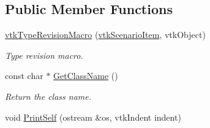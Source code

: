 \subsection*{Public Member Functions}
\begin{DoxyCompactItemize}
\item 
\hypertarget{classvtkScenarioItem_ac1b3cca069a98dc214fe9b3e0058bc6c}{
\hyperlink{classvtkScenarioItem_ac1b3cca069a98dc214fe9b3e0058bc6c}{vtkTypeRevisionMacro} (\hyperlink{classvtkScenarioItem}{vtkScenarioItem}, vtkObject)}
\label{classvtkScenarioItem_ac1b3cca069a98dc214fe9b3e0058bc6c}

\begin{DoxyCompactList}\small\item\em Type revision macro. \item\end{DoxyCompactList}\item 
\hypertarget{classvtkScenarioItem_ae81ad46352f0a673792f2964de67efc1}{
const char $\ast$ \hyperlink{classvtkScenarioItem_ae81ad46352f0a673792f2964de67efc1}{GetClassName} ()}
\label{classvtkScenarioItem_ae81ad46352f0a673792f2964de67efc1}

\begin{DoxyCompactList}\small\item\em Return the class name. \item\end{DoxyCompactList}\item 
\hypertarget{classvtkScenarioItem_a6cc74a69d066978485087c6dea3b72d1}{
void \hyperlink{classvtkScenarioItem_a6cc74a69d066978485087c6dea3b72d1}{PrintSelf} (ostream \&os, vtkIndent indent)}
\label{classvtkScenarioItem_a6cc74a69d066978485087c6dea3b72d1}


\end{DoxyCompactItemize}
